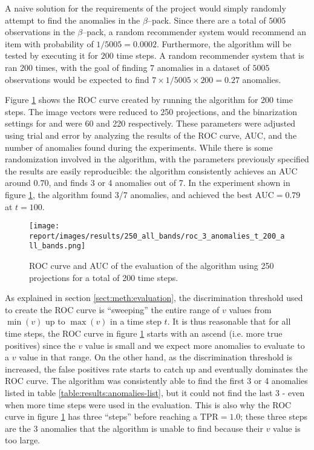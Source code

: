 A naive solution for the requirements of the \vasco project would simply randomly attempt to find the anomalies in the $\beta$--pack. Since there are a total of $5005$ observations in the $\beta$--pack, a random recommender system would recommend an item with probability of $1/5005 = 0.0002$. Furthermore, the \mlblink algorithm will be tested by executing it for $200$ time steps. A random recommender system that is ran $200$ times, with the goal of finding $7$ anomalies in a dataset of $5005$ observations would be expected to find $7 \times 1/5005 \times 200 = 0.27$ anomalies. \newline

Figure \ref{fig:evaluation:roc-curve} shows the ROC curve created by running the \mlblink algorithm for 200 time steps. The image vectors were reduced to 250 projections, and the binarization settings for \usno and \panstarrs were 60 and 220 respectively. These parameters were adjusted using trial and error by analyzing the results of the ROC curve, AUC, and the number of anomalies found during the experiments. While there is some randomization involved in the algorithm, with the parameters previously specified the results are easily reproducible: the \mlblink algorithm consistently achieves an AUC around $0.70$, and finds 3 or 4 anomalies out of 7. In the experiment shown in figure \ref{fig:evaluation:roc-curve}, the \mlblink algorithm found 3/7 anomalies, and achieved the best $\text{AUC} = 0.79$ at $t = 100$. \newline

\begin{figure}
  \centering
  \texttt{[image: report/images/results/250\_all\_bands/roc\_3\_anomalies\_t\_200\_all\_bands.png]}
  \caption{ROC curve and AUC of the evaluation of the \mlblink algorithm using 250 projections for a total of 200 time steps.}
  \label{fig:evaluation:roc-curve}
\end{figure}

As explained in section \ref{sect:meth:evaluation}, the discrimination threshold used to create the ROC curve is ``sweeping'' the entire range of $v$ values from $\min(v)$ up to $\max(v)$ in a time step $t$. It is thus reasonable that for all time steps, the ROC curve in figure \ref{fig:evaluation:roc-curve} starts with an ascend (i.e. more true positives) since the $v$ value is small and we expect more anomalies to evaluate to a $v$ value in that range. On the other hand, as the discrimination threshold is increased, the false positives rate starts to catch up and eventually dominates the ROC curve. The \mlblink algorithm was consistently able to find the first 3 or 4 anomalies listed in table \ref{table:results:anomalies-list}, but it could not find the last 3 - even when more time steps were used in the evaluation. This is also why the ROC curve in figure \ref{fig:evaluation:roc-curve} has three ``steps'' before reaching a $\text{TPR} = 1.0$; these three steps are the 3 anomalies that the \mlblink algorithm is unable to find because their $v$ value is too large. \newline

